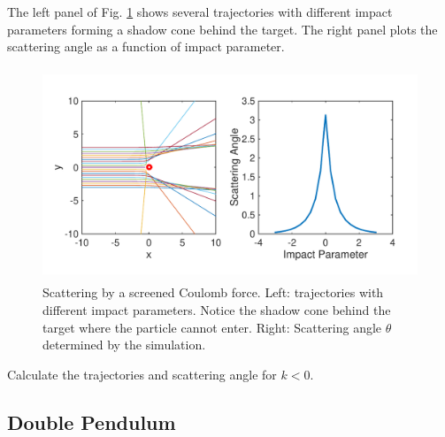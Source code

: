 The left panel of Fig. \ref{fig:scattering2} shows several trajectories with different impact parameters forming a shadow cone behind the target.  The right panel plots the scattering angle as a function of impact parameter.

\begin{figure}
\centerline{\includegraphics[height=2.5in]{05.ode1/scattering2.pdf}}
\caption{Scattering by a screened Coulomb force. Left: trajectories with different impact parameters. Notice the shadow cone behind the target where the particle cannot enter.  Right: Scattering angle $\theta$ determined by the simulation.}
\label{fig:scattering2}
\end{figure}

\bigskip
\exercise
Calculate the trajectories and scattering angle for $k<0$.

\subsection{Double Pendulum}


